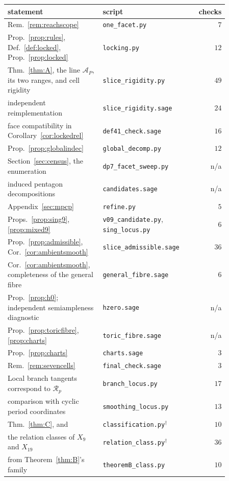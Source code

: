 \documentclass[11pt]{amsart}
\theoremstyle{definition}
\theoremstyle{remark}
\theoremstyle{plain}
\newcommand{\Rsm}{\mathcal{R}}   %
\newcommand{\cA}{\mathcal{A}}
\begin{document}
{\small
\begin{longtable}{@{}p{0.43\linewidth}p{0.43\linewidth}r@{}}
\toprule
statement & script & checks \\
\midrule
\endhead
Rem.~\ref{rem:reachscope}
  & \texttt{one\_facet.py} & $7$ \\
Prop.~\ref{prop:rules}, Def.~\ref{def:locked}, Prop.~\ref{prop:locked}
  & \texttt{locking.py} & $12$ \\
Thm.~\ref{thm:A}, the line $\cA_P$, its two ranges, and cell rigidity
  & \texttt{slice\_rigidity.py} & $49$ \\
\quad independent reimplementation
  & \texttt{slice\_rigidity.sage} & $24$ \\
\quad face compatibility in Corollary~\ref{cor:lockedrel}
  & \texttt{def41\_check.sage} & $16$ \\
Prop.~\ref{prop:globalindec}
  & \texttt{global\_decomp.py} & $12$ \\
Section~\ref{sec:census}, the enumeration
  & \texttt{dp7\_facet\_sweep.py} & n/a \\
\quad induced pentagon decompositions
  & \texttt{candidates.sage} & n/a \\
Appendix~\ref{sec:mpcp}
  & \texttt{refine.py} & $5$ \\
Props.~\ref{prop:sing9}, \ref{prop:mixed9}
  & \texttt{v09\_candidate.py}, \texttt{sing\_locus.py} & $6$ \\
Prop.~\ref{prop:admissible}, Cor.~\ref{cor:ambientsmooth}
  & \texttt{slice\_admissible.sage} & $36$ \\
Cor.~\ref{cor:ambientsmooth}, completeness of the general fibre
  & \texttt{general\_fibre.sage} & $6$ \\
Prop.~\ref{prop:h0}; independent semiampleness diagnostic
  & \texttt{hzero.sage} & n/a \\
Prop.~\ref{prop:toricfibre}, \ref{prop:charts}
  & \texttt{toric\_fibre.sage} & n/a \\
Prop.~\ref{prop:charts}
  & \texttt{charts.sage} & $3$ \\
Rem.~\ref{rem:sevencells}
  & \texttt{final\_check.sage} & $3$ \\
Local branch tangents correspond to $\Rsm_p$
  & \texttt{branch\_locus.py} & $17$ \\
\quad comparison with cyclic period coordinates
  & \texttt{smoothing\_locus.py} & $13$ \\
Thm.~\ref{thm:C}, and \cite[Prop.~9.2]{PaperIV}
  & \texttt{classification.py}$^{\dagger}$ & $10$ \\
the relation classes of $X_9$ and $X_{19}$
  & \texttt{relation\_class.py}$^{\dagger}$ & $36$ \\
\quad from Theorem~\ref{thm:B}'s family
  & \texttt{theoremB\_class.py} & $10$ \\
\bottomrule
\end{longtable}
}
\end{document}
